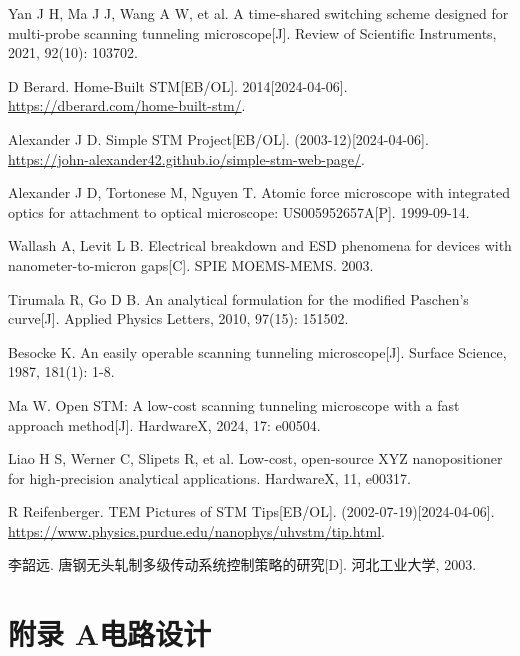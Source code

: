 \documentclass{article}
\begin{document}
\begin{spacing}{1.5}
\begin{thebibliography}{25}
	 Yan J H, Ma J J, Wang A W, et al. A time-shared switching scheme designed for multi-probe scanning tunneling microscope[J]. Review of Scientific Instruments, 2021, 92(10): 103702.
	
	 D Berard. Home-Built STM[EB/OL]. 2014[2024-04-06]. \href{https://dberard.com/home-built-stm/}{https://dberard.com/home-built-stm/}.
	
	 Alexander J D. Simple STM Project[EB/OL]. (2003-12)[2024-04-06]. \href{https://john-alexander42.github.io/simple-stm-web-page/}{https://john-alexander42.github.io/simple-stm-web-page/}.
	
	 Alexander J D, Tortonese M, Nguyen T. Atomic force microscope with integrated optics for attachment to optical microscope: US005952657A[P]. 1999-09-14.
	
	 Wallash A, Levit L B. Electrical breakdown and ESD phenomena for devices with nanometer-to-micron gaps[C]. SPIE MOEMS-MEMS. 2003. 
	
	 Tirumala R, Go D B. An analytical formulation for the modified Paschen’s curve[J]. Applied Physics Letters, 2010, 97(15): 151502.
	
	 Besocke K. An easily operable scanning tunneling microscope[J]. Surface Science, 1987, 181(1): 1-8.
	
	 Ma W. Open STM: A low-cost scanning tunneling microscope with a fast approach method[J]. HardwareX, 2024, 17: e00504.
	
	 Liao H S, Werner C, Slipets R, et al. Low-cost, open-source XYZ nanopositioner for high-precision analytical applications. HardwareX, 11, e00317.
	
	 R Reifenberger. TEM Pictures of STM Tips[EB/OL]. (2002-07-19)[2024-04-06]. \href{https://www.physics.purdue.edu/nanophys/uhvstm/tip.html}{https://www.physics.purdue.edu/nanophys/uhvstm/tip.html}.
	
	 李韶远. 唐钢无头轧制多级传动系统控制策略的研究[D]. 河北工业大学, 2003.
	
	
\end{thebibliography}
\end{spacing}


\newpage
\appendix
\section*{附录 A\quad 电路设计}
{} %
\label{app:A}
\end{document}
